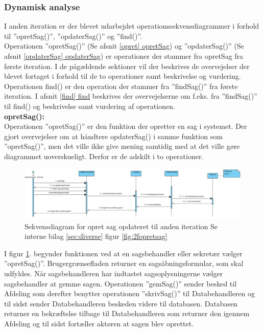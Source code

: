 \subsubsection{Dynamisk analyse}
I anden iteration er der blevet udarbejdet operationssekvensdiagrammer i forhold til ”opretSag()”, ”opdaterSag()” og ”find()”. \\
Operationen ”opretSag()” (Se afsnit \underline{\ref{opret} opretSag}) og ”opdaterSag()” (Se afsnit \underline{\ref{opdaterSag} opdaterSag}) er operationer der stammer fra opretSag fra første iteration. I de pågældende sektioner vil der beskrives de overvejelser der blevet fortaget i forhold til de to operationer samt beskrivelse og vurdering. \\
Operationen find() er den operation der stammer fra ”findSag()” fra første iteration. I afsnit \underline{\ref{find} find} beskrives der overvejelserne om f.eks. fra ”findSag()” til find() og beskrivelse samt vurdering af operationen.\\ 
\textbf{opretSag():} \label{opret} \\ 
Operationen ”opretSag()” er den funktion der opretter en sag i systemet. Der gjort overvejelser om at håndtere opdaterSag() i samme funktion som ”opretSag()”, men det ville ikke give mening samtidig med at det ville gøre diagrammet uoverskueligt. Derfor er de adskilt i to operationer. \\
\begin{figure}[htb!]
  \includegraphics[scale = 0.5]{./PNG/analyse/opretsag2.PNG} 
  \caption{Sekvensdiagram for opret sag opdateret til anden iteration Se interne bilag \ref{sec:diverse} figur \ref{fig:2fopretsag}}
  \label{fig:2opret}
\end{figure}
I figur \ref{fig:2opret}. begynder funktionen ved at en sagsbehandler eller sekretær vælger ”opretSag()”. Brugergrænsefladen returner en sagsåbningsformular, som skal udfyldes. Når sagsbehandleren har indtastet sagsoplysningerne vælger sagsbehandler at gemme sagen. Operationen ”gemSag()” sender besked til Afdeling som derefter benytter operationen ”skrivSag()” til Databehandleren og til sidst sender Databehandleren beskeden videre til databasen. Databasen returner en bekræftelse tilbage til Databehandleren som returner den igennem Afdeling og til sidst fortæller aktøren at sagen blev oprettet. \\
